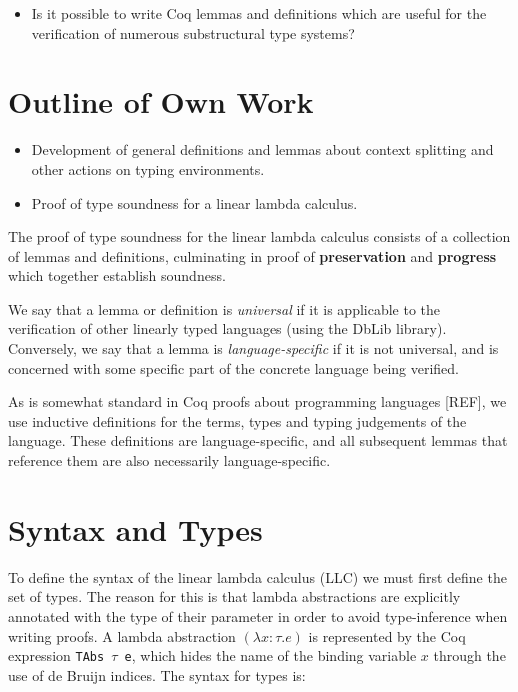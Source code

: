 \documentclass[]{unswthesis}
\let\c\texttt
\begin{document}
\begin{itemize}
\item Is it possible to write Coq lemmas and definitions which are useful for the verification of numerous substructural type systems?
\end{itemize}



\section{Outline of Own Work}

\begin{itemize}
\item Development of general definitions and lemmas about context splitting and other actions on typing environments.
\item Proof of type soundness for a linear lambda calculus.
\end{itemize}

The proof of type soundness for the linear lambda calculus consists of a collection of lemmas and definitions, culminating in proof of \textbf{preservation} and \textbf{progress} which together establish soundness.

We say that a lemma or definition is \textit{universal} if it is applicable to the verification of other linearly typed languages (using the DbLib library). Conversely, we say that a lemma is \textit{language-specific} if it is not universal, and is concerned with some specific part of the concrete language being verified.

As is somewhat standard in Coq proofs about programming languages [REF], we use inductive definitions for the terms, types and typing judgements of the language. These definitions are language-specific, and all subsequent lemmas that reference them are also necessarily language-specific.


\section{Syntax and Types}

To define the syntax of the linear lambda calculus (LLC) we must first define the set of types. The reason for this is that lambda abstractions are explicitly annotated with the type of their parameter in order to avoid type-inference when writing proofs. A lambda abstraction $(\lambda x : \tau. e)$ is represented by the Coq expression \c{TAbs $\tau$ e}, which hides the name of the binding variable $x$ through the use of de Bruijn indices. The syntax for types is:
\end{document}

